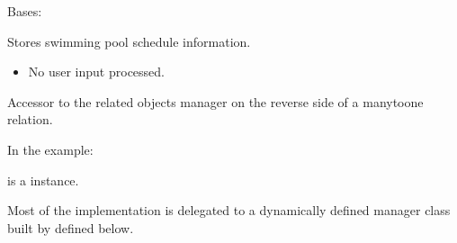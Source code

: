 \documentclass[letterpaper,10pt,english]{sphinxmanual}
\begin{document}
\begin{fulllineitems}
\label{\detokenize{index:core.models.SwimmingPoolInfo}}
\pysigstartsignatures
\pysiglinewithargsret
{}
{\sphinxparamcomma {}}
{}
\pysigstopsignatures
\sphinxAtStartPar
Bases: 

\sphinxAtStartPar
Stores swimming pool schedule information.
\begin{description}
\begin{itemize}
\item {} 
\sphinxAtStartPar
No user input processed.

\end{itemize}

\end{description}

\begin{fulllineitems}
\label{\detokenize{index:core.models.SwimmingPoolInfo.translations}}
\pysigstartsignatures
\pysigline
{}
\pysigstopsignatures
\sphinxAtStartPar
Accessor to the related objects manager on the reverse side of a
many\sphinxhyphen{}to\sphinxhyphen{}one relation.

\sphinxAtStartPar
In the example:

\begin{sphinxVerbatim}[commandchars=\\\{\}]
       
\end{sphinxVerbatim}

\sphinxAtStartPar
{} is a  instance.

\sphinxAtStartPar
Most of the implementation is delegated to a dynamically defined manager
class built by  defined below.


\end{fulllineitems}
\end{fulllineitems}
\end{document}
